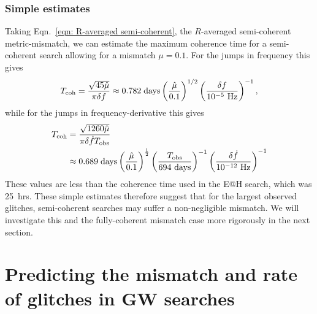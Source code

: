 \documentclass[../full_thesis/full_thesis.tex]{subfiles}
\begin{document}
\subsubsection{Simple estimates}
Taking Eqn.~\eqref{eqn: R-averaged semi-coherent}, the $R$-averaged semi-coherent
metric-mismatch,
we can estimate the maximum coherence time
for a semi-coherent search allowing for a mismatch $\mu=0.1$. For the jumps in
frequency this gives
\begin{align}
T_{\mathrm{coh}} = \frac{\sqrt{45\hat{\mu}}}{\pi\delta f}
\approx 0.782 \;\mathrm{ days}
\left(\frac{\hat{\mu}}{0.1}\right)^{1/2}
\left(\frac{\delta f}{10^{-5}\textrm{ Hz}}\right)^{-1},
\end{align}
while for the jumps in frequency-derivative this gives
\begin{align}
\begin{split}
T_{\mathrm{coh}} & = \frac{\sqrt{1260\hat{\mu}}}{\pi\delta\dot{f}T_{\mathrm{obs}}} \\
& \approx 0.689 \;\mathrm{ days}
\left(\frac{\hat{\mu}}{0.1}\right)^{\frac{1}{2}}
\left(\frac{T_{\mathrm{obs}}}{694 \textrm{ days}}\right)^{-1}
\left(\frac{\delta\dot{f}}{10^{-12}\textrm{ Hz}}\right)^{-1}
\end{split}
\end{align}
These values are less than the coherence time used in the E@H search, which
was 25~hrs. These simple estimates therefore suggest that for the largest
observed glitches, semi-coherent searches may suffer a non-negligible mismatch.
We will investigate this and the fully-coherent mismatch case more rigorously
in the next section.

\section{Predicting the mismatch and rate of glitches in GW searches}
\label{sec: estimating the mismatch}
\end{document}
